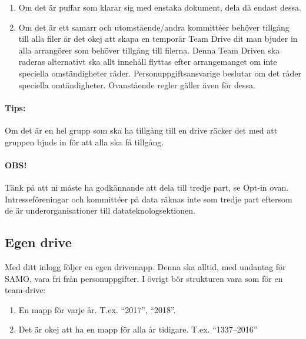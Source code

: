 \begin{enumerate}
    \item Om det är puffar som klarar sig med enstaka dokument, dela då endast dessa.
    \item Om det är ett samarr och utomstående/andra kommittéer behöver tillgång till alla filer är det okej att skapa en temporär Team Drive dit man bjuder in alla arrangörer som behöver tillgång till filerna. Denna Team Driven ska raderas alternativt ska allt innehåll flyttas efter arrangemanget om inte speciella omständigheter råder. Personuppgiftsansvarige beslutar om det råder speciella omtändigheter. Ovanstående regler gäller även för dessa.
\end{enumerate}

\paragraph{Tips:} Om det är en hel grupp som ska ha tillgång till en drive räcker det med att gruppen bjuds in för att alla ska få tillgång.

\paragraph{OBS!} Tänk på att ni måste ha godkännande att dela till tredje part, se Opt-in ovan. Intresseföreningar och kommittéer på data räknas inte som tredje part eftersom de är underorganisationer till datateknologsektionen. %

\subsection{Egen drive}
Med ditt inlogg följer en egen drivemapp. Denna ska alltid, med undantag för SAMO, vara fri från personuppgifter. I övrigt bör strukturen vara som för en team-drive:

\begin{enumerate}
    \item En mapp för varje år. T.ex. ``2017'', ``2018''. 
    \item Det är okej att ha en mapp för alla år tidigare. T.ex. ``1337--2016''
\end{enumerate}

